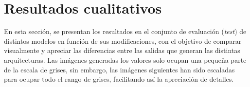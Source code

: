 \section{Resultados cualitativos}

En esta sección, se presentan los resultados en el conjunto de evaluación (\textit{test}) de distintos modelos en función de sus modificaciones, con el objetivo de comparar visualmente y apreciar las diferencias entre las salidas que generan las distintas arquitecturas. Las imágenes generadas los valores solo ocupan una pequeña parte de la escala de grises, sin embargo, las imágenes siguientes han sido escaladas para ocupar todo el rango de grises, facilitando así la apreciación de detalles. 






